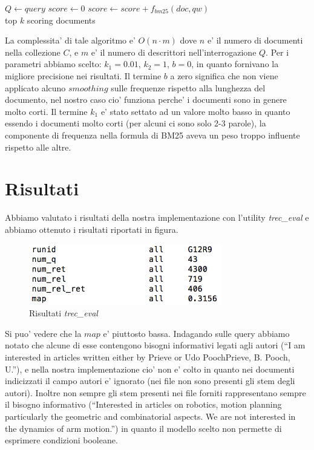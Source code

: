 \documentclass[12pt]{article}
\begin{document}
\begin{algorithmic}
\State $Q \gets query$
    \State $score\gets 0$
        \State $score \gets score + f_{bm25}(doc, qw)$
    \EndFor
\EndFor\\
\Return top $k$ scoring documents
\end{algorithmic}

La complessita' di tale algoritmo e' $O(n \cdot m)$ dove $n$ e' il numero di documenti nella collezione $C$, e $m$ e' il numero di descrittori nell'interrogazione $Q$. Per i parametri abbiamo scelto: $k_1=0.01$, $k_2=1$, $b=0$, in quanto fornivano la migliore precisione nei risultati. Il termine $b$ a zero significa che non viene applicato alcuno $smoothing$ sulle frequenze rispetto alla lunghezza del documento, nel nostro caso cio' funziona perche' i documenti sono in genere molto corti. Il termine $k_1$ e' stato settato ad un valore molto basso in quanto essendo i documenti molto corti (per alcuni ci sono solo 2-3 parole), la componente di frequenza nella formula di BM25 aveva un peso troppo influente rispetto alle altre.

\section{Risultati}
Abbiamo valutato i risultati della nostra implementazione con l'utility \textit{trec\_eval} e abbiamo ottenuto i risultati riportati in figura.
\begin{figure}[htbp]
\begin{center}
\includegraphics[width=0.75\textwidth]{myresult.png}
\caption{Risultati \textit{trec\_eval}}
\label{fig:fig1}
\end{center}
\end{figure}

Si puo' vedere che la $map$ e' piuttosto bassa. Indagando sulle query abbiamo notato che alcune di esse contengono bisogni informativi legati agli autori (``I am interested in articles written either by Prieve or Udo PoochPrieve, B. Pooch, U.''), e nella nostra implementazione cio' non e' colto in quanto nei documenti indicizzati il campo autori e' ignorato (nei file non sono presenti gli stem degli autori). Inoltre non sempre gli stem presenti nei file forniti rappresentano sempre il bisogno informativo (``Interested in articles on robotics, motion planning particularly the geometric and combinatorial aspects. We are not interested in the dynamics of arm motion.'') in quanto il modello scelto non permette di esprimere condizioni booleane.
\end{document}
